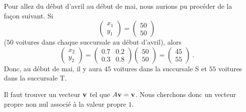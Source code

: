 {Pour allez du début d'avril au début de mai, nous aurions pu procéder de la
façon suivant.  Si
\[
\begin{pmatrix} x_1 \\ y_1 \end{pmatrix} =
\begin{pmatrix} 50 \\ 50 \end{pmatrix}
\]
($50$ voitures dans chaque succursale au début d'avril), alors
\[
\begin{pmatrix} x_2 \\ y_2 \end{pmatrix} =
\begin{pmatrix} 0.7 & 0.2 \\ 0.3 & 0.8  \end{pmatrix}
\begin{pmatrix} 50 \\ 50 \end{pmatrix}
=
\begin{pmatrix} 45 \\ 55 \end{pmatrix} \ .
\]
Donc, au début de mai, il y aura $45$ voitures dans la succursale S et
$55$ voitures dans la succursale T.

 Il faut trouver un vecteur $\displaystyle \mathbf{v}$ tel
que $A\mathbf{v} = \mathbf{v}$.  Nous cherchons donc un vecteur propre non nul
associé à la valeur propre $1$.

}
